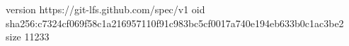 version https://git-lfs.github.com/spec/v1
oid sha256:c7324cf069f58c1a216957110f91c983bc5cf0017a740e194eb633b0c1ac3be2
size 11233
